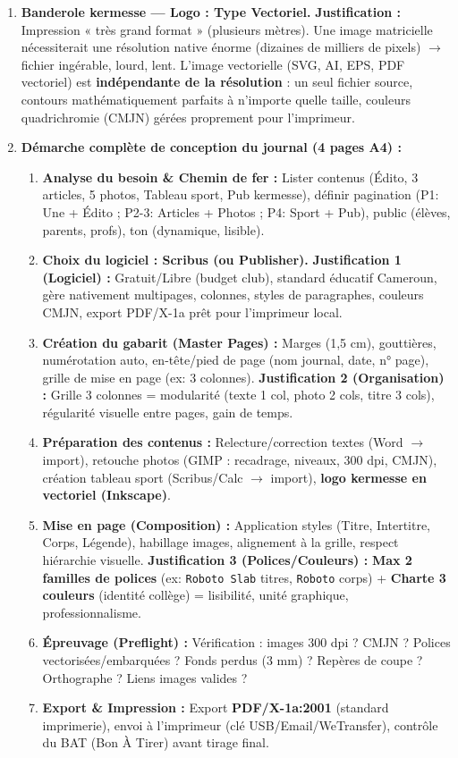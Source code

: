 \documentclass[11pt]{article}
\newcommand{\cle}[1]{{\popxbold\color{popdark}#1}}
\begin{document}
\begin{corrige}
\begin{enumerate}
\item \textbf{Banderole kermesse — Logo : Type \cle{Vectoriel}.}
\textbf{Justification :} Impression « très grand format » (plusieurs mètres). Une image matricielle nécessiterait une résolution native énorme (dizaines de milliers de pixels) $\rightarrow$ fichier ingérable, lourd, lent. L'image vectorielle (SVG, AI, EPS, PDF vectoriel) est \textbf{indépendante de la résolution} : un seul fichier source, contours mathématiquement parfaits à n'importe quelle taille, couleurs quadrichromie (CMJN) gérées proprement pour l'imprimeur.

\item \textbf{Démarche complète de conception du journal (4 pages A4) :}
\begin{enumerate}
\item \textbf{Analyse du besoin \& Chemin de fer :} Lister contenus (Édito, 3 articles, 5 photos, Tableau sport, Pub kermesse), définir pagination (P1: Une + Édito ; P2-3: Articles + Photos ; P4: Sport + Pub), public (élèves, parents, profs), ton (dynamique, lisible).
\item \textbf{Choix du logiciel : \cle{Scribus} (ou Publisher).}
\textbf{Justification 1 (Logiciel) :} Gratuit/Libre (budget club), standard éducatif Cameroun, gère nativement multipages, colonnes, styles de paragraphes, couleurs CMJN, export PDF/X-1a prêt pour l'imprimeur local.
\item \textbf{Création du gabarit (Master Pages) :} Marges (1,5 cm), gouttières, numérotation auto, en-tête/pied de page (nom journal, date, n° page), grille de mise en page (ex: 3 colonnes).
\textbf{Justification 2 (Organisation) :} Grille 3 colonnes = modularité (texte 1 col, photo 2 cols, titre 3 cols), régularité visuelle entre pages, gain de temps.
\item \textbf{Préparation des contenus :} Relecture/correction textes (Word $\rightarrow$ import), retouche photos (GIMP : recadrage, niveaux, 300 dpi, CMJN), création tableau sport (Scribus/Calc $\rightarrow$ import), \textbf{logo kermesse en vectoriel (Inkscape)}.
\item \textbf{Mise en page (Composition) :} Application styles (Titre, Intertitre, Corps, Légende), habillage images, alignement à la grille, respect hiérarchie visuelle.
\textbf{Justification 3 (Polices/Couleurs) :} \textbf{Max 2 familles de polices} (ex: \texttt{Roboto Slab} titres, \texttt{Roboto} corps) + \textbf{Charte 3 couleurs} (identité collège) = lisibilité, unité graphique, professionnalisme.
\item \textbf{Épreuvage (Preflight) :} Vérification : images 300 dpi ? CMJN ? Polices vectorisées/embarquées ? Fonds perdus (3 mm) ? Repères de coupe ? Orthographe ? Liens images valides ?
\item \textbf{Export \& Impression :} Export \textbf{PDF/X-1a:2001} (standard imprimerie), envoi à l'imprimeur (clé USB/Email/WeTransfer), contrôle du BAT (Bon À Tirer) avant tirage final.
\end{enumerate}
\end{enumerate}
\end{corrige}
\end{document}
